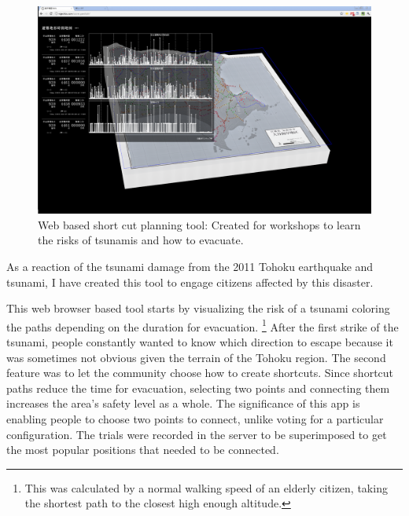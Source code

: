 \begin{figure}[htb]
  \includegraphics[width=\textwidth]{chapters/3/fig/nigechizu002.png}               
  \caption[nigechizu]{Web based short cut planning tool: Created for workshops to learn the risks of tsunamis and how to evacuate.}
  \label{fig:nigechizu}
\end{figure}

As a reaction of the tsunami damage from the 2011 Tohoku earthquake and tsunami, I have created this tool to engage citizens affected by this disaster.

This web browser based tool starts by visualizing the risk of a tsunami coloring the paths depending on the duration for evacuation.
\footnote{This was calculated by a normal walking speed of an elderly citizen, taking the shortest path to the closest high enough altitude.}
After the first strike of the tsunami, people constantly wanted to know which direction to escape because it was sometimes not obvious given the  terrain of the Tohoku region. The second feature was to let the community choose how to create shortcuts. Since shortcut paths reduce the time for evacuation, selecting two points and connecting them increases the area's safety level as a whole. The significance of this app is enabling people to choose two points to connect, unlike voting for a particular configuration. The trials were recorded in the server to be superimposed to get the most popular positions that needed to be connected.

